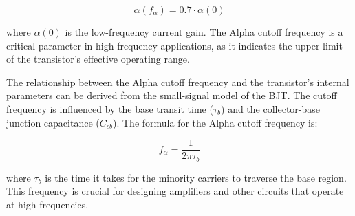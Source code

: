 \[
\alpha(f_{\alpha}) = 0.7 \cdot \alpha(0)
\]

where \(\alpha(0)\) is the low-frequency current gain. The Alpha cutoff frequency is a critical parameter in high-frequency applications, as it indicates the upper limit of the transistor's effective operating range.

The relationship between the Alpha cutoff frequency and the transistor's internal parameters can be derived from the small-signal model of the BJT. The cutoff frequency is influenced by the base transit time (\(\tau_b\)) and the collector-base junction capacitance (\(C_{cb}\)). The formula for the Alpha cutoff frequency is:

\[
f_{\alpha} = \frac{1}{2\pi \tau_b}
\]

where \(\tau_b\) is the time it takes for the minority carriers to traverse the base region. This frequency is crucial for designing amplifiers and other circuits that operate at high frequencies.

